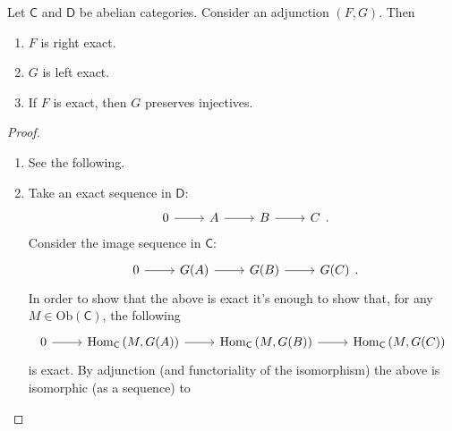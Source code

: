 \documentclass[../Main]{subfiles}
\begin{document}
\begin{prop}[]
	Let $\mathsf{C}$ and $\mathsf{D}$ be abelian categories.
	Consider an adjunction $(F,G)$.
	Then
	\begin{enumerate}
		\item $F$ is right exact.
		\item $G$ is left exact.
		\item If $F$ is exact, then
			$G$ preserves injectives.
	\end{enumerate}
\end{prop}

\begin{proof}\leavevmode\vspace{-.2\baselineskip}
\begin{enumerate}
	\item See the following.
	\item Take an exact sequence in $\mathsf{D}$:
	       \begin{equation}
	       \begin{tikzcd}
		       0 \arrow[r, "", rightarrow] &
		       A \arrow[r, "", rightarrow] &
		       B \arrow[r, "", rightarrow] &
		       C
	       \end{tikzcd}
	       .\end{equation} 
	       Consider the image sequence in $\mathsf{C}$:
	       \begin{equation}
	       \begin{tikzcd}
		       0 \arrow[r, "", rightarrow] &
		       G(A) \arrow[r, "", rightarrow] &
		       G(B) \arrow[r, "", rightarrow] &
		       G(C)
	       \end{tikzcd}
	       .\end{equation} 
	       In order to show
	       that the above is exact 
	       it's enough to show that, for any $M \in \mathrm{Ob} \left(\mathsf{C}\right)$,
	       the following
	       \begin{equation}
	       \begin{tikzcd}
		       0 \arrow[r, "", rightarrow] &
		       \mathrm{Hom}_{\mathsf{C}} \left( M, G(A) \right) \arrow[r, "", rightarrow] &
		       \mathrm{Hom}_{\mathsf{C}} \left( M, G(B) \right) \arrow[r, "", rightarrow] &
		       \mathrm{Hom}_{\mathsf{C}} \left( M, G(C) \right)
	       \end{tikzcd}
	       \end{equation} 
	       is exact.
	       By adjunction (and functoriality of the isomorphism)
	       the above is isomorphic (as a sequence) to
	       \begin{equation}

\end{equation}
\end{enumerate}
\end{proof}
\end{document}
